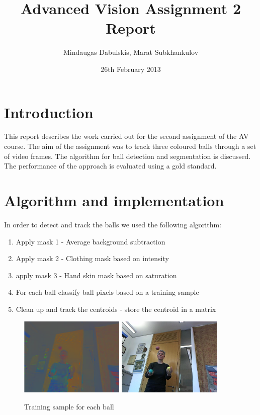 \documentclass[10pt,a4paper,oneclumn]{article}
\title{Advanced Vision Assignment 2 Report}  %
\author{Mindaugas Dabulskis, Marat Subkhankulov}                      %
\date{26th February 2013}                 %
\begin{document}
\maketitle  %
%
\section{Introduction}

This report describes the work carried out for the second assignment of the AV course.
The aim of the assignment was to track three coloured balls through a set of video frames.
The algorithm for ball detection and segmentation is discussed. 
The performance of the approach is evaluated using a gold standard.

\section{Algorithm and implementation}

In order to detect and track the balls we used the following algorithm:

\begin{enumerate}
\item Apply mask 1 - Average background subtraction
\item Apply mask 2 - Clothing mask based on intensity
\item apply mask 3 - Hand skin mask based on saturation
\item For each ball classify ball pixels based on a training sample
\item Clean up and track the centroids - store the centroid in a matrix
\end{enumerate}

\begin{figure}[h!]
\centering
  \includegraphics[width=5cm]{figures/imnrgb.png}
  \includegraphics[width=5cm]{figures/original.png}
\caption{Training sample for each ball}
\end{figure}
\end{document}
